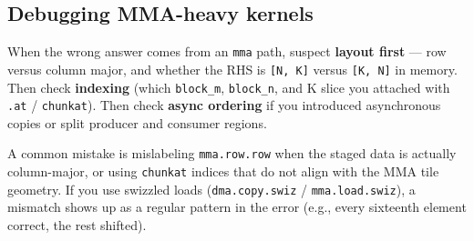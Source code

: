 \subsection*{Debugging MMA-heavy kernels}

When the wrong answer comes from an \texttt{mma} path, suspect \textbf{layout first} --- row versus column major, and whether the RHS is \texttt{[N, K]} versus \texttt{[K, N]} in memory. Then check \textbf{indexing} (which \texttt{block\_m}, \texttt{block\_n}, and K slice you attached with \texttt{.at} / \texttt{chunkat}). Then check \textbf{async ordering} if you introduced asynchronous copies or split producer and consumer regions.

A common mistake is mislabeling \texttt{mma.row.row} when the staged data is actually column-major, or using \texttt{chunkat} indices that do not align with the MMA tile geometry. If you use swizzled loads (\texttt{dma.copy.swiz} / \texttt{mma.load.swiz}), a mismatch shows up as a regular pattern in the error (e.g., every sixteenth element correct, the rest shifted).
